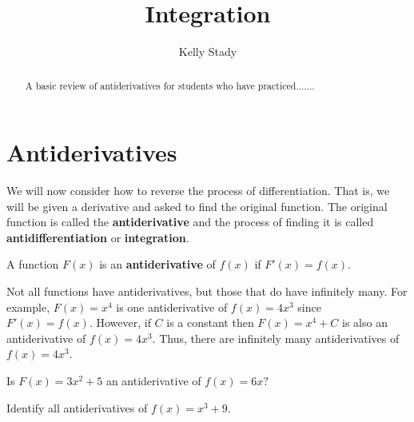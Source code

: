 \documentclass{ximera}
\title{Integration}   %
\author{Kelly Stady}
\begin{document}
\begin{abstract}
    A basic review of antiderivatives for students who have practiced.......
\end{abstract}
\maketitle
\label{xim:Integration}



\section*{Antiderivatives}

We will now consider how to reverse the process of differentiation.  That is, we will be
given a derivative and asked to find the original function. The original function is called
the \textbf{antiderivative} and the process of finding it is called
\textbf{antidifferentiation} or \textbf{integration}.

\begin{theorem}

A function $F(x)$ is an \textbf{antiderivative} of $f(x)$ if $F'(x)=f(x).$
\end{theorem}

\begin{remark}
Not all functions have antiderivatives, but those that do have infinitely many.  For example, $F(x)=x^4$ is
one antiderivative of $f(x)=4x^3$ since $F'(x) = f(x).$  However, if $C$ is a constant then $F(x)= x^4+C$ 
is also an antiderivative of $f(x)=4x^3.$  Thus, there are infinitely many antiderivatives of
$f(x)=4x^3.$

\end{remark}

\begin{problem}
Is $F(x) = 3x^2+5$ an antiderivative of $f(x) = 6x?$

\begin{multipleChoice}
\end{multipleChoice}


\end{problem}


\begin{problem}
Identify all antiderivatives of $f(x)=x^3+9.$

\begin{selectAll}
\end{selectAll}

\end{problem}
\end{document}
